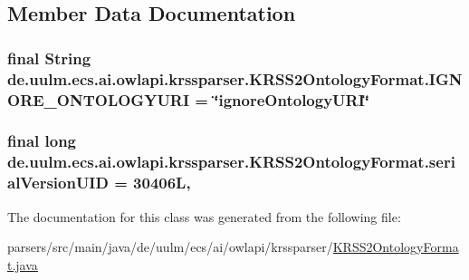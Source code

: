 \subsection{Member Data Documentation}
\hypertarget{classde_1_1uulm_1_1ecs_1_1ai_1_1owlapi_1_1krssparser_1_1_k_r_s_s2_ontology_format_a86e38eb1f55e10756ffda14d31e807b1}{
\subsubsection[{I\-G\-N\-O\-R\-E\-\_\-\-O\-N\-T\-O\-L\-O\-G\-Y\-U\-R\-I}]{\setlength{\rightskip}{0pt plus 5cm}final String de.\-uulm.\-ecs.\-ai.\-owlapi.\-krssparser.\-K\-R\-S\-S2\-Ontology\-Format.\-I\-G\-N\-O\-R\-E\-\_\-\-O\-N\-T\-O\-L\-O\-G\-Y\-U\-R\-I = \char`\"{}ignore\-Ontology\-U\-R\-I\char`\"{}\hspace{0.3cm}{\ttfamily [static]}}}\label{classde_1_1uulm_1_1ecs_1_1ai_1_1owlapi_1_1krssparser_1_1_k_r_s_s2_ontology_format_a86e38eb1f55e10756ffda14d31e807b1}
\hypertarget{classde_1_1uulm_1_1ecs_1_1ai_1_1owlapi_1_1krssparser_1_1_k_r_s_s2_ontology_format_a1092bdb2448f8cf027d5b129e0bfd059}{
\subsubsection[{serial\-Version\-U\-I\-D}]{\setlength{\rightskip}{0pt plus 5cm}final long de.\-uulm.\-ecs.\-ai.\-owlapi.\-krssparser.\-K\-R\-S\-S2\-Ontology\-Format.\-serial\-Version\-U\-I\-D = 30406\-L\hspace{0.3cm}{\ttfamily [static]}, {\ttfamily [private]}}}\label{classde_1_1uulm_1_1ecs_1_1ai_1_1owlapi_1_1krssparser_1_1_k_r_s_s2_ontology_format_a1092bdb2448f8cf027d5b129e0bfd059}


The documentation for this class was generated from the following file\-:\begin{DoxyCompactItemize}
\item 
parsers/src/main/java/de/uulm/ecs/ai/owlapi/krssparser/\hyperlink{_k_r_s_s2_ontology_format_8java}{K\-R\-S\-S2\-Ontology\-Format.\-java}\end{DoxyCompactItemize}
